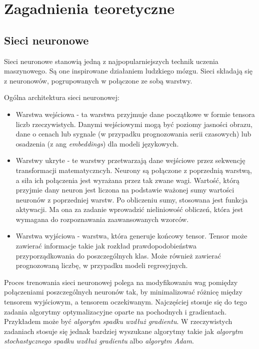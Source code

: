 \chapter{Zagadnienia teoretyczne}

\section{Sieci neuronowe}

Sieci neuronowe stanowią jedną z najpopularniejszych technik uczenia maszynowego. Są one inspirowane działaniem ludzkiego mózgu. Sieci składają się z neuronowów, pogrupowanych w połączone ze sobą warstwy.

Ogólna architektura sieci neuronowej:
\begin{itemize}
    \item Warstwa wejściowa - ta warstwa przyjmuje dane początkowe w formie tensora liczb rzeczywistych. Danymi wejściowymi mogą być poziomy jasności obrazu, dane o cenach lub sygnale (w przypadku prognozowania serii czasowych) lub osadzenia (z ang \textit{embeddings}) dla modeli językowych.
    \item Warstwy ukryte - te warstwy przetwarzają dane wejściowe przez sekwencję transformacji matematyczncyh. Neurony są połączone z poprzednią warstwą, a siła ich połączenia jest wyrażana przez tak zwane wagi. Wartość, którą przyjmie dany neuron jest liczona na podstawie ważonej sumy wartości neuronów z poprzedniej warstw. Po obliczeniu sumy, stosowana jest funkcja aktywacji. Ma ona za zadanie wprowadzić nieliniowość obliczeń, która jest wymagana do rozpoznawania zaawansowanych wzorców.
    \item Warstwa wyjściowa - warstwa, która generuje końcowy tensor. Tensor może zawierać informacje takie jak rozkład prawdopodobieństwa przyporządkowania do poszczególnych klas. Może również zawierać prognozowaną liczbę, w przypadku modeli regresyjnych.
\end{itemize}

Proces trenowania sieci neuronowej polega na modyfikowaniu wag pomiędzy połączeniami poszczególnych neuronów tak, by minimalizować różnicę między tensorem wyjściowym, a tensorem oczekiwanym.
Najczęściej stosuje się do tego zadania algorytmy optymalizacyjne oparte na pochodnych i gradientach. Przykładem może być \textit{algorytm spadku wzdłuż gradientu}.
W rzeczywistych zadaniach stosuje się jednak bardziej wyszukane algorytmy takie jak \textit{algorytm stochastycznego spadku wzdłuż gradientu} albo \textit{algorytm Adam}.

